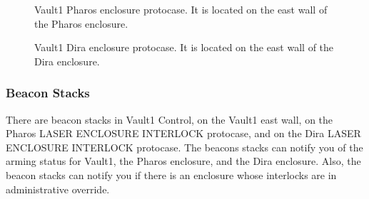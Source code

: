 \documentclass[letterpaper,10pt,english]{sphinxmanual}
\begin{document}
\begin{figure}[htbp]
\centering
\capstart

\noindent{}
\caption{ Vault\sphinxhyphen{}1 Pharos enclosure protocase.
It is located on the east wall of the Pharos enclosure.}\label{\detokenize{user_documentation/Vault-1_laser:id1}}\end{figure}

\begin{figure}[htbp]
\centering
\capstart

\noindent{}
\caption{ Vault\sphinxhyphen{}1 Dira enclosure protocase.
It is located on the east wall of the Dira enclosure.}\label{\detokenize{user_documentation/Vault-1_laser:id2}}\end{figure}


\subsubsection{Beacon Stacks}
\label{\detokenize{user_documentation/Vault-1_laser:beacon-stacks}}
\sphinxAtStartPar
There are beacon stacks in Vault\sphinxhyphen{}1 Control, on the Vault\sphinxhyphen{}1 east wall, on the Pharos LASER ENCLOSURE INTERLOCK protocase, and on the Dira LASER ENCLOSURE INTERLOCK protocase.
The beacons stacks can notify you of the arming status for Vault\sphinxhyphen{}1, the Pharos enclosure, and the Dira enclosure.
Also, the beacon stacks can notify you if there is an enclosure whose interlocks are in administrative override.
\end{document}
